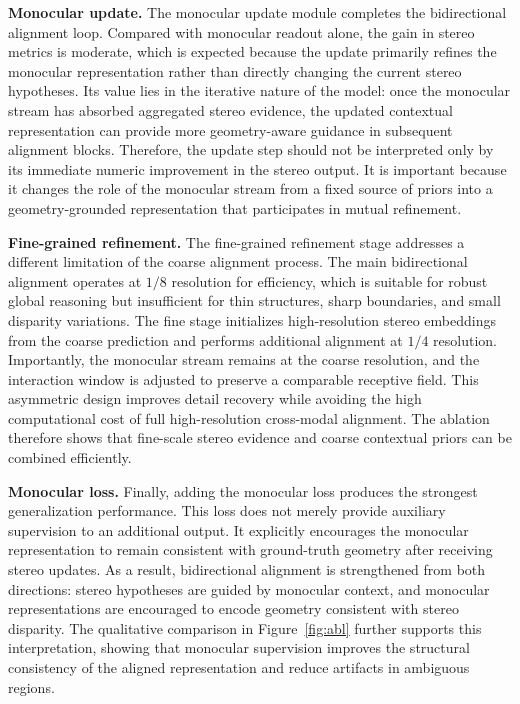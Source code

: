 \noindent\textbf{Monocular update.} The monocular update module completes the bidirectional alignment loop. 
Compared with monocular readout alone, the gain in stereo metrics is moderate, which is expected because the update primarily refines the monocular representation rather than directly changing the current stereo hypotheses.
Its value lies in the iterative nature of the model: once the monocular stream has absorbed aggregated stereo evidence, the updated contextual representation can provide more geometry-aware guidance in subsequent alignment blocks.
Therefore, the update step should not be interpreted only by its immediate numeric improvement in the stereo output.
It is important because it changes the role of the monocular stream from a fixed source of priors into a geometry-grounded representation that participates in mutual refinement.

\noindent\textbf{Fine-grained refinement.} The fine-grained refinement stage addresses a different limitation of the coarse alignment process.
The main bidirectional alignment operates at $1/8$ resolution for efficiency, which is suitable for robust global reasoning but insufficient for thin structures, sharp boundaries, and small disparity variations.
The fine stage initializes high-resolution stereo embeddings from the coarse prediction and performs additional alignment at $1/4$ resolution.
Importantly, the monocular stream remains at the coarse resolution, and the interaction window is adjusted to preserve a comparable receptive field.
This asymmetric design improves detail recovery while avoiding the high computational cost of full high-resolution cross-modal alignment.
The ablation therefore shows that fine-scale stereo evidence and coarse contextual priors can be combined efficiently.

\noindent\textbf{Monocular loss.} Finally, adding the monocular loss produces the strongest generalization performance.
This loss does not merely provide auxiliary supervision to an additional output.
It explicitly encourages the monocular representation to remain consistent with ground-truth geometry after receiving stereo updates.
As a result, bidirectional alignment is strengthened from both directions: stereo hypotheses are guided by monocular context, and monocular representations are encouraged to encode geometry consistent with stereo disparity.
The qualitative comparison in Figure~\ref{fig:abl} further supports this interpretation, showing that monocular supervision improves the structural consistency of the aligned representation and reduce artifacts in ambiguous regions.

